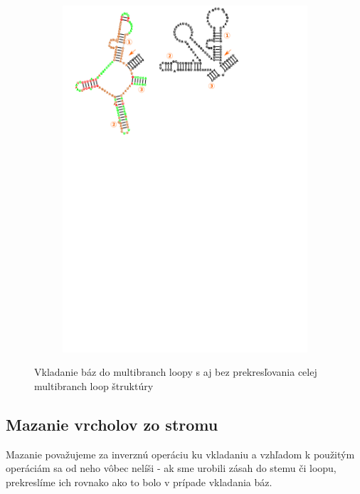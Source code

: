 \begin{figure}
\begin{subfigure}{\wi}
    \includegraphics[clip, trim=1cm 18cm 13cm 0, width=1\textwidth]{../img/alg/insert/multibranch-redraw}
  \end{subfigure}

  \caption{Vkladanie báz do multibranch loopy s aj bez prekresľovania celej multibranch loop štruktúry}
  \label{obr:insert_multibranch}
\end{figure}





\subsection{Mazanie vrcholov zo stromu}

Mazanie považujeme za inverznú operáciu ku vkladaniu a vzhľadom k použitým operáciám
sa od neho vôbec nelíši - ak sme urobili zásah do stemu či loopu, prekreslíme
ich rovnako ako to bolo v prípade vkladania báz.




